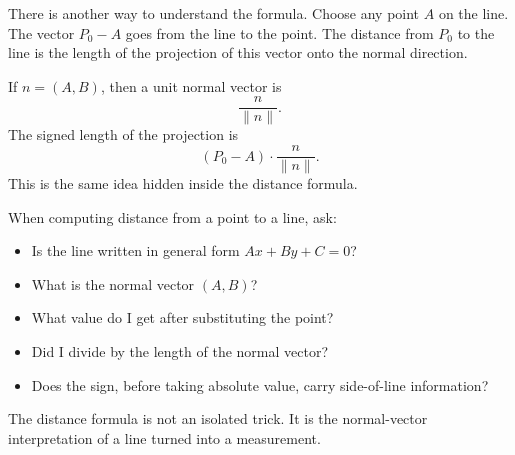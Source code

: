 There is another way to understand the formula. Choose any point \(A\) on the line. The vector \(P_0-A\) goes from the line to the point. The distance from \(P_0\) to the line is the length of the projection of this vector onto the normal direction.

If \(n=(A,B)\), then a unit normal vector is
\[
\frac{n}{\lVert n\rVert}.
\]
The signed length of the projection is
\[
(P_0-A)\cdot \frac{n}{\lVert n\rVert}.
\]
This is the same idea hidden inside the distance formula.

\begin{summarybox}
When computing distance from a point to a line, ask:
\begin{itemize}
\item Is the line written in general form \(Ax+By+C=0\)?
\item What is the normal vector \((A,B)\)?
\item What value do I get after substituting the point?
\item Did I divide by the length of the normal vector?
\item Does the sign, before taking absolute value, carry side-of-line information?
\end{itemize}
\end{summarybox}

The distance formula is not an isolated trick. It is the normal-vector interpretation of a line turned into a measurement.